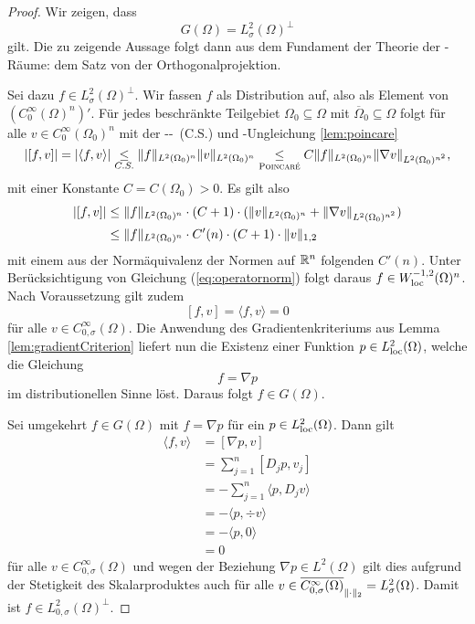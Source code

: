 \begin{proof}
  Wir zeigen, dass 
  \begin{equation}
    \label{eq:orthComplement}
    G(\Omega) = L_\sigma^2(\Omega)^\perp
  \end{equation}
  gilt.
  Die zu zeigende Aussage folgt dann aus dem Fundament der Theorie der \hilbert\hyp{}Räume: dem Satz von der Orthogonalprojektion.

  Sei dazu $f \in L_\sigma^2(\Omega)^\perp$.
  Wir fassen $f$ als Distribution auf, also als Element von $(C_0^\infty(\Omega)^n)'$.
  Für jedes beschränkte Teilgebiet $\Omega_0 \subseteq \Omega$ mit $\overline\Omega_0 \subseteq \Omega$ folgt für alle $v \in C_0^\infty(\Omega_0)^n$ mit der \cauchy\hyp\schwartz-\ (C.S.) und \poincare\hyp{}Ungleichung \ref{lem:poincare}
  $$
  |[f, v]| 
  = |\langle f, v \rangle| 
  \underset{C.S.}{\leq}  \norm{f}_{L^2(\Omega_0)^n} \norm{v}_{L^2(\Omega_0)^n}
  \underset{\poincare}{\leq} C \norm{f}_{L^2(\Omega_0)^n} \norm{\nabla v}_{L^2(\Omega_0)^{n^2}},
  $$
  mit einer Konstante $C = C(\Omega_0) > 0$.
  Es gilt also 
  \begin{align*}
    |[f, v]| 
    &\leq \norm{f}_{L^2(\Omega_0)^n} \cdot ( C + 1) \cdot (\norm{v}_{L^2(\Omega_0)^n} + \norm{\nabla v}_{L^2(\Omega_0)^{n^2}}) \\
    &\leq \norm{f}_{L^2(\Omega_0)^n} \cdot C'(n) \cdot ( C + 1) \cdot \norm{v}_{1,2}
  \end{align*}
  mit einem aus der Normäquivalenz der Normen auf $\R^n$ folgenden $C'(n)$.
  Unter Berücksichtigung von Gleichung (\ref{eq:operatornorm}) folgt daraus $f \in W_{\loc}^{-1,2}(\Omega)^n$.
  Nach Voraussetzung gilt zudem 
  $$
  [f,v] = \langle f, v \rangle = 0
  $$
  für alle $v \in C_{0, \sigma}^\infty(\Omega)$.
  Die Anwendung des Gradientenkriteriums aus Lemma \ref{lem:gradientCriterion} liefert nun die Existenz einer Funktion $p \in L_{\loc}^2(\Omega)$, welche die Gleichung
  $$
  f = \nabla p
  $$
  im distributionellen Sinne löst.
  Daraus folgt $f \in G(\Omega)$.

  Sei umgekehrt $f \in G(\Omega)$ mit $f = \nabla p$ für ein $p \in L^2_{\loc}(\Omega)$.
  Dann gilt
  \begin{align*}
  \langle f, v \rangle
  &= [ \nabla p, v ] \\
  &= \sum_{j = 1}^n [ D_j p , v_j ] \\
  &= - \sum_{j = 1}^n \langle p, D_j v \rangle \\
  &= - \langle p, \div v \rangle  \\
  &= - \langle p, 0 \rangle  \\
  &= 0
  \end{align*}
  für alle $v \in C_{0, \sigma}^\infty(\Omega)$ und wegen der Beziehung $\nabla p \in L^2(\Omega)$ gilt dies aufgrund der Stetigkeit des Skalarproduktes auch für alle $v \in \overline{C_{0, \sigma}^\infty(\Omega)}_{\norm{\cdot}_2} = L_\sigma^2(\Omega)$.
  Damit ist $f \in L_{0,\sigma}^2(\Omega)^\perp$.
\end{proof}

